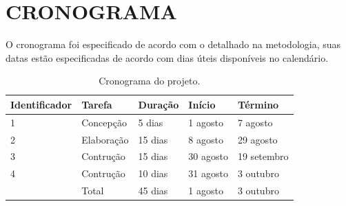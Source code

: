 \documentclass{article}
\begin{document}
\section{CRONOGRAMA}

O cronograma foi especificado de acordo com o detalhado na metodologia, suas datas estão especificadas de acordo com dias úteis disponíveis no calendário.


\begin{table}[!htbp]
                           \begin{center}
                \begin{tabular}{ | l | l | l | l | l |}
                \hline
                \textbf{Identificador}& \textbf{Tarefa} &  \textbf{Duração} & \textbf{Início} & \textbf{Término} \\  \hline
                1 & Concepção & 5 dias & 1 agosto & 7 agosto \\  \hline
                2 & Elaboração & 15 dias & 8 agosto & 29 agosto \\  \hline
                3 & Contrução & 15 dias & 30 agosto & 19 setembro \\  \hline
                4 & Contrução & 10 dias & 31 agosto & 3 outubro \\ \hline
                  & Total & 45 dias & 1 agosto & 3 outubro \\
                \hline
                \end{tabular}
            \end{center}
               \caption{Cronograma do projeto. \label{fig:Cordova}}
\end{table}

\newpage
\end{document}
